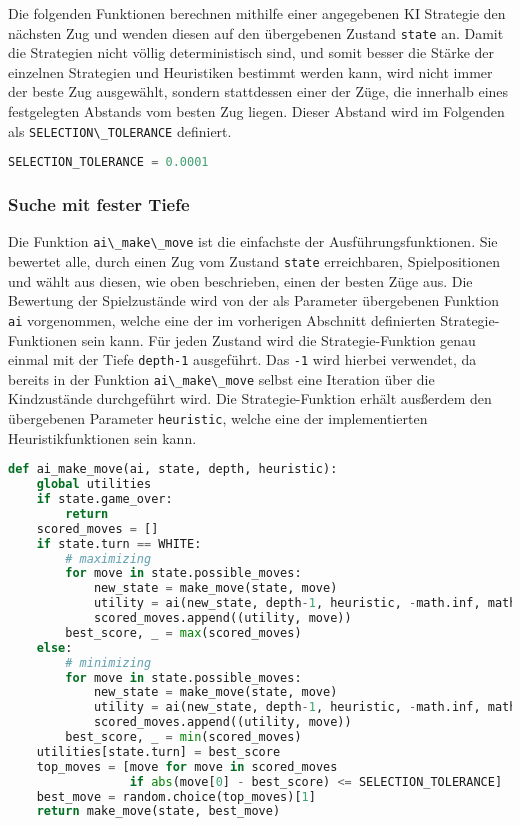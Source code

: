 Die folgenden Funktionen berechnen mithilfe einer angegebenen KI
Strategie den nächsten Zug und wenden diesen auf den übergebenen Zustand
\passthrough{\lstinline!state!} an. Damit die Strategien nicht völlig
deterministisch sind, und somit besser die Stärke der einzelnen
Strategien und Heuristiken bestimmt werden kann, wird nicht immer der
beste Zug ausgewählt, sondern stattdessen einer der Züge, die innerhalb
eines festgelegten Abstands vom besten Zug liegen. Dieser Abstand wird
im Folgenden als \passthrough{\lstinline!SELECTION\_TOLERANCE!}
definiert.

\begin{lstlisting}[language=Python]
SELECTION_TOLERANCE = 0.0001
\end{lstlisting}

\hypertarget{suche-mit-fester-tiefe}{%
\subsubsection{Suche mit fester Tiefe}\label{suche-mit-fester-tiefe}}

Die Funktion \passthrough{\lstinline!ai\_make\_move!} ist die einfachste
der Ausführungsfunktionen. Sie bewertet alle, durch einen Zug vom
Zustand \passthrough{\lstinline!state!} erreichbaren, Spielpositionen
und wählt aus diesen, wie oben beschrieben, einen der besten Züge aus.
Die Bewertung der Spielzustände wird von der als Parameter übergebenen
Funktion \passthrough{\lstinline!ai!} vorgenommen, welche eine der im
vorherigen Abschnitt definierten Strategie-Funktionen sein kann. Für
jeden Zustand wird die Strategie-Funktion genau einmal mit der Tiefe
\passthrough{\lstinline!depth-1!} ausgeführt. Das
\passthrough{\lstinline!-1!} wird hierbei verwendet, da bereits in der
Funktion \passthrough{\lstinline!ai\_make\_move!} selbst eine Iteration
über die Kindzustände durchgeführt wird. Die Strategie-Funktion erhält
ausßerdem den übergebenen Parameter \passthrough{\lstinline!heuristic!},
welche eine der implementierten Heuristikfunktionen sein kann.

\begin{lstlisting}[language=Python]
def ai_make_move(ai, state, depth, heuristic):
    global utilities
    if state.game_over:
        return
    scored_moves = []
    if state.turn == WHITE:
        # maximizing
        for move in state.possible_moves:
            new_state = make_move(state, move)
            utility = ai(new_state, depth-1, heuristic, -math.inf, math.inf)
            scored_moves.append((utility, move))
        best_score, _ = max(scored_moves)
    else:
        # minimizing
        for move in state.possible_moves:
            new_state = make_move(state, move)
            utility = ai(new_state, depth-1, heuristic, -math.inf, math.inf)
            scored_moves.append((utility, move))
        best_score, _ = min(scored_moves)
    utilities[state.turn] = best_score
    top_moves = [move for move in scored_moves
                 if abs(move[0] - best_score) <= SELECTION_TOLERANCE]
    best_move = random.choice(top_moves)[1]
    return make_move(state, best_move)
\end{lstlisting}

